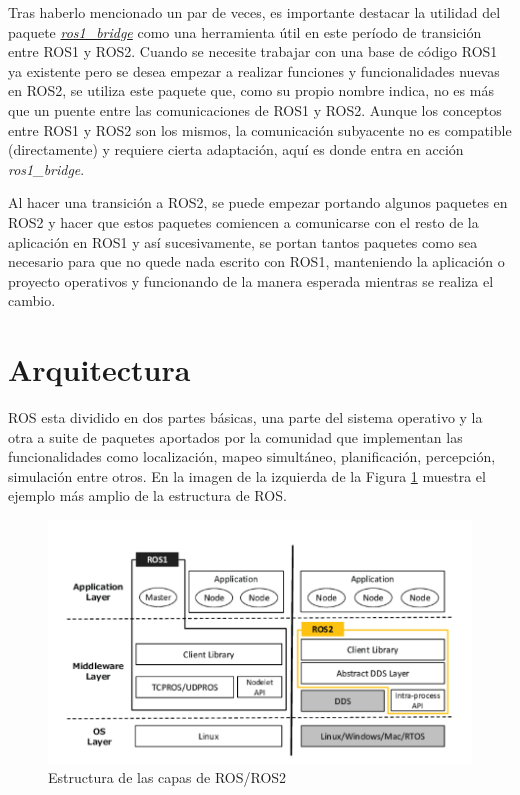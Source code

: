 Tras haberlo mencionado un par de veces, es importante destacar la utilidad del paquete \href{https://github.com/ros2/ros1_bridge}{\textit{ros1\_bridge}} como una herramienta útil en este período de transición entre ROS1 y ROS2. Cuando se necesite trabajar con una base de código ROS1 ya existente pero se desea empezar a realizar funciones y funcionalidades nuevas en ROS2, se utiliza este paquete que, como su propio nombre indica, no es más que un puente entre las comunicaciones de ROS1 y ROS2. Aunque los conceptos entre ROS1 y ROS2 son los mismos, la comunicación subyacente no es compatible (directamente) y requiere cierta adaptación, aquí es donde entra en acción \textit{ros1\_bridge}.

Al hacer una transición a ROS2, se puede empezar portando algunos paquetes en ROS2 y hacer que estos paquetes comiencen a comunicarse con el resto de la aplicación en ROS1 y así sucesivamente, se portan tantos paquetes como sea necesario para que no quede nada escrito con ROS1, manteniendo la aplicación o proyecto operativos y funcionando de la manera esperada mientras se realiza el cambio.

\section{Arquitectura}

ROS esta dividido en dos partes básicas, una parte del sistema operativo y la otra a suite de paquetes aportados por la comunidad que implementan las funcionalidades como localización, mapeo simultáneo, planificación, percepción, simulación entre otros. En la imagen de la izquierda de la Figura \ref{fig:Estructura} muestra el ejemplo más amplio de la estructura de ROS.

\begin{figure}[H]
	\centering
	\includegraphics[scale=0.75]{imagenes/Estructura.png}
	\caption{\label{fig:Estructura}Estructura de las capas de ROS/ROS2}
\end{figure}

